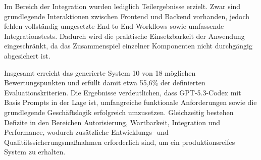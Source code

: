 Im Bereich der Integration wurden lediglich Teilergebnisse erzielt. Zwar sind grundlegende Interaktionen zwischen Frontend und Backend vorhanden, jedoch fehlen vollständig umgesetzte End-to-End-Workflows sowie umfassende Integrationstests. Dadurch wird die praktische Einsetzbarkeit der Anwendung eingeschränkt, da das Zusammenspiel einzelner Komponenten nicht durchgängig abgesichert ist.

Insgesamt erreicht das generierte System 10 von 18 möglichen Bewertungspunkten und erfüllt damit etwa 55,6\% der definierten Evaluationskriterien. Die Ergebnisse verdeutlichen, dass GPT-5.3-Codex mit Basis Prompts in der Lage ist, umfangreiche funktionale Anforderungen sowie die grundlegende Geschäftslogik erfolgreich umzusetzen. Gleichzeitig bestehen Defizite in den Bereichen Autorisierung, Wartbarkeit, Integration und Performance, wodurch zusätzliche Entwicklungs- und Qualitätssicherungsmaßnahmen erforderlich sind, um ein produktionsreifes System zu erhalten.